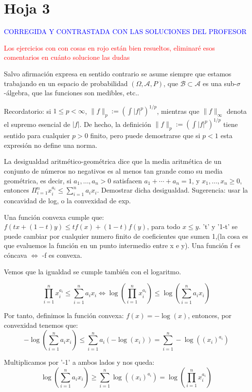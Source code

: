 

\newpage
\section{Hoja 3}

\textcolor{blue}{CORREGIDA Y CONTRASTADA CON LAS SOLUCIONES DEL PROFESOR}

\textcolor{red}{Los ejercicios con con cosas en rojo están bien resueltos, eliminaré esos comentarios en cuánto solucione las dudas}

Salvo afirmaci\'on expresa en sentido
contrario se asume siempre que estamos trabajando en un espacio de probabilidad $(\Omega, \mathcal{A}, P)$,
que  $\mathcal{B}\subset \mathcal{A}$ es una sub-$\sigma$-\'algebra, que las funciones son medibles, etc..

Recordatorio: si $1\le p < \infty$, $\|f\|_p := \left(\int|f|^p\right)^{1/p}$, mientras que
$\|f\|_\infty$ denota el supremo esencial de $|f|$. De hecho, la definici\'on
 $\|f\|_p := \left(\int|f|^p\right)^{1/p}$ tiene sentido para cualquier $p > 0$ finito, pero puede demostrarse que si $p < 1$ esta expresi\'on no define una norma.


\begin{problem}[1] La desigualdad aritm\'etico-geom\'etrica 
dice que la media  aritm\'etica de un conjunto de n\'umeros no negativos es al menos tan grande
como su media  geom\'etrica, es decir, si $a_1, \dots ,a_n > 0$ satisfacen  $a_1 + \cdots  + a_n = 1$,  y  
 $x_1, \dots ,x_n \ge 0$, entonces $\Pi_{i=1}^n x_i^{a_i} \le \sum_{i=1}^n a_i x_i$.
Demostrar dicha desigualdad. Sugerencia: usar la concavidad
de log, o la convexidad de exp.
\solution

\begin{expla}
Una función convexa cumple que: $f(tx+(1-t)y) \leq tf(x)+(1-t)f(y)$, para todo $x\leq y$. 't' y '1-t' se puede cambiar por cualquier numero finito de coeficientes que sumen 1,(la cosa es que evaluemos la función en un punto intermedio entre x e y).
Una función f es cóncava $\Leftrightarrow$ -f es convexa.
\end{expla}
Vemos que la igualdad se cumple también con el logaritmo.

\[
\prod_{i=1}^n x_i^{a_i} \leq \sum_{i=1}^{n}a_i x_i \Leftrightarrow \log\left(\prod_{i=1}^n x_i^{a_i}\right) \leq \log \left(\sum_{i=1}^{n}a_i x_i\right)
\]

Por tanto, definimos la función convexa: $f(x) = -\log(x)$, entonces, por convexidad tenemos que:
\[
-\log \left(\sum_{i=1}^{n}a_i x_i\right) \leq \sum_{i=1}^{n} a_i\left(-\log(x_i)\right) = \sum_{i=1}^{n} -\log\left((x_i)^{a_i}\right) 
\]
 
Multiplicamos por '-1' a ambos lados y nos queda:
\[
\log \left(\sum_{i=1}^{n}a_i x_i\right) \geq \sum_{i=1}^{n} \log\left((x_i)^{a_i}\right) = \log\left(\prod_{i=1}^n x_i^{a_i}\right) 
\]


\end{problem}


